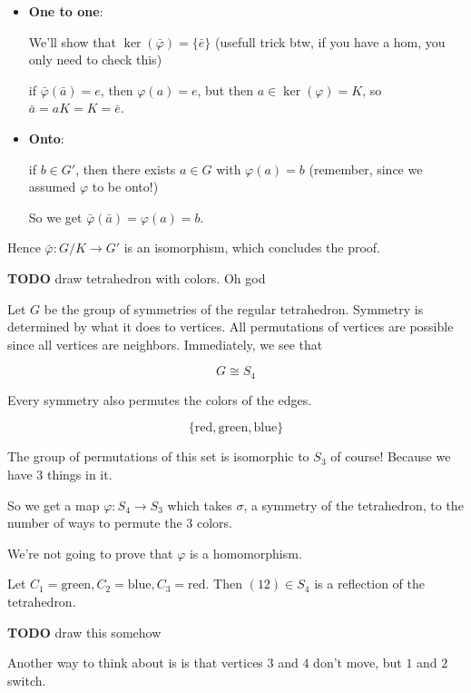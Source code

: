 \documentclass[12pt]{article}
\newcommand{\TODO}{\color{red}\textbf{TODO}\color{black}}
\begin{document}
{\begin{itemize}
    \item {\bf One to one}:

      We'll show that $\ker(\bar \varphi) = \{ \bar e \}$ (usefull trick btw, if you have a hom, you only need to check this)

      if $\bar \varphi(\bar a) = e$, then $\varphi(a) = e$, but then $a \in
      \ker(\varphi) = K$, so $\bar a = aK = K = \bar e$.

    \item {\bf Onto}:

      if $b \in G'$, then there exists $a \in G$ with $\varphi(a) = b$
      (remember, since we assumed $\varphi$ to be onto!)

      So we get $\bar \varphi(\bar a) = \varphi(a) = b$.
  \end{itemize}

  Hence $\bar \varphi: G / K \to G'$ is an isomorphism, which concludes the
  proof.
}


\TODO{} draw tetrahedron with colors. Oh god

Let $G$ be the group of symmetries of the regular tetrahedron. Symmetry is
determined by what it does to vertices. All permutations of vertices are
possible since all vertices are neighbors. Immediately, we see that

\[
  G \cong S_4
\]

Every symmetry also permutes the colors of the edges.

\[
  \{\text{red}, \text{green}, \text{blue}\}
\]

The group of permutations of this set is isomorphic to $S_3$ of course! Because
we have 3 things in it.

So we get a map $\varphi: S_4 \to S_3$ which takes $\sigma$, a symmetry of the
tetrahedron, to the number of ways to permute the $3$ colors.

We're not going to prove that $\varphi$ is a homomorphism.

Let $C_1 = \text{green}, C_2 = \text{blue}, C_3 = \text{red}$. Then $(12) \in
S_4$ is a reflection of the tetrahedron.

\TODO{} draw this somehow

Another way to think about is is that vertices $3$ and $4$ don't move, but $1$
and $2$ switch.
\end{document}
